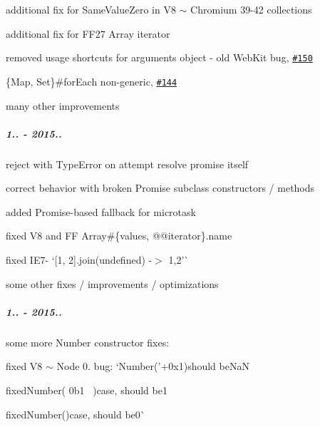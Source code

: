 \begin{DoxyItemize}
\item additional fix for {\ttfamily Same\+Value\+Zero} in V8 $\sim$ Chromium 39-\/42 collections
\item additional fix for F\+F27 {\ttfamily Array} iterator
\item removed usage shortcuts for {\ttfamily arguments} object -\/ old Web\+Kit bug, \href{https://github.com/zloirock/core-js/issues/150}{\tt \#150}
\item {\ttfamily \{Map, Set\}\#for\+Each} non-\/generic, \href{https://github.com/zloirock/core-js/issues/144}{\tt \#144}
\item many other improvements
\end{DoxyItemize}

\subparagraph*{1.. -\/ 2015..}


\begin{DoxyItemize}
\item reject with {\ttfamily Type\+Error} on attempt resolve promise itself
\item correct behavior with broken {\ttfamily Promise} subclass constructors / methods
\item added {\ttfamily Promise}-\/based fallback for microtask
\item fixed V8 and FF {\ttfamily Array\#\{values, @@iterator\}.name}
\item fixed I\+E7-\/ `\mbox{[}1, 2\mbox{]}.join(undefined) -\/$>$ \textquotesingle{}1,2'\`{}
\item some other fixes / improvements / optimizations
\end{DoxyItemize}

\subparagraph*{1.. -\/ 2015..}


\begin{DoxyItemize}
\item some more {\ttfamily Number} constructor fixes\+:
\begin{DoxyItemize}
\item fixed V8 $\sim$ Node 0. bug\+: `Number('+0x1\textquotesingle{}){\ttfamily should be}NaN{\ttfamily }
\item {\ttfamily fixed}Number(\textquotesingle{} 0b1~\newline
\textquotesingle{}){\ttfamily case, should be}1{\ttfamily }
\item {\ttfamily fixed}Number(){\ttfamily case, should be}0\`{}
\end{DoxyItemize}
\end{DoxyItemize}

